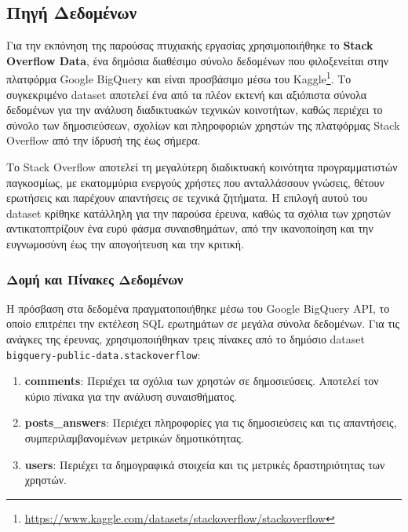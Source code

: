 \documentclass[a4paper,11pt,oneside,openany]{ioniothesis}
\begin{document}
\subsection{Πηγή Δεδομένων}

Για την εκπόνηση της παρούσας πτυχιακής εργασίας χρησιμοποιήθηκε το \textbf{Stack Overflow Data}, ένα δημόσια διαθέσιμο σύνολο δεδομένων που φιλοξενείται στην πλατφόρμα Google BigQuery και είναι προσβάσιμο μέσω του Kaggle\footnote{\url{https://www.kaggle.com/datasets/stackoverflow/stackoverflow}}. Το συγκεκριμένο dataset αποτελεί ένα από τα πλέον εκτενή και αξιόπιστα σύνολα δεδομένων για την ανάλυση διαδικτυακών τεχνικών κοινοτήτων, καθώς περιέχει το σύνολο των δημοσιεύσεων, σχολίων και πληροφοριών χρηστών της πλατφόρμας Stack Overflow από την ίδρυσή της έως σήμερα.

Το Stack Overflow αποτελεί τη μεγαλύτερη διαδικτυακή κοινότητα προγραμματιστών παγκοσμίως, με εκατομμύρια ενεργούς χρήστες που ανταλλάσσουν γνώσεις, θέτουν ερωτήσεις και παρέχουν απαντήσεις σε τεχνικά ζητήματα. Η επιλογή αυτού του dataset κρίθηκε κατάλληλη για την παρούσα έρευνα, καθώς τα σχόλια των χρηστών αντικατοπτρίζουν ένα ευρύ φάσμα συναισθημάτων, από την ικανοποίηση και την ευγνωμοσύνη έως την απογοήτευση και την κριτική.

\subsubsection{Δομή και Πίνακες Δεδομένων}

Η πρόσβαση στα δεδομένα πραγματοποιήθηκε μέσω του Google BigQuery API, το οποίο επιτρέπει την εκτέλεση SQL ερωτημάτων σε μεγάλα σύνολα δεδομένων. Για τις ανάγκες της έρευνας, χρησιμοποιήθηκαν τρεις πίνακες από το δημόσιο dataset \texttt{bigquery-public-data.stackoverflow}:

\begin{enumerate}
    \item \textbf{comments}: Περιέχει τα σχόλια των χρηστών σε δημοσιεύσεις. Αποτελεί τον κύριο πίνακα για την ανάλυση συναισθήματος.
    
    \item \textbf{posts\_answers}: Περιέχει πληροφορίες για τις δημοσιεύσεις και τις απαντήσεις, συμπεριλαμβανομένων μετρικών δημοτικότητας.
    
    \item \textbf{users}: Περιέχει τα δημογραφικά στοιχεία και τις μετρικές δραστηριότητας των χρηστών.
\end{enumerate}
\end{document}
